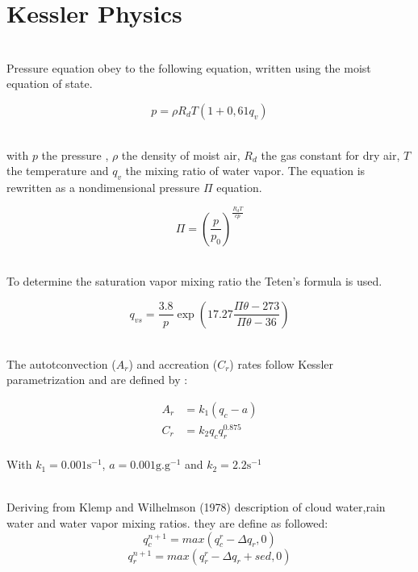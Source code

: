 \documentclass[times,doublespace]{fldauth}
\begin{document}
\clearpage
\section{Kessler Physics}

~\\Pressure equation obey to the following equation, written using the moist equation of state.

\begin{equation}
p=\rho R_dT(1+0,61q_v)
\end{equation}

~\\ with $p$ the pressure , $\rho$ the density of moist air, $R_d$ the gas constant for dry air, $T$ the temperature and $q_v$ the mixing ratio of water vapor. The equation is rewritten as a nondimensional pressure $\Pi$ equation.

\begin{equation}
\Pi=\left(\frac{p}{p_0}\right)^{\frac{R_dT}{cp}}
\end{equation}


~\\To determine the saturation vapor mixing ratio the Teten's formula is used.

\begin{equation}
q_{vs}=\frac{3.8}{p}\exp\left(17.27\frac{\Pi \theta-273}{\Pi \theta-36}\right)
\end {equation}



~\\The autotconvection ($A_r$) and accreation ($C_r$) rates follow Kessler parametrization and are defined by :

\begin{equation}
\begin{split}
A_r&=k_1(q_c-a) \\
C_r&=k_2q_cq_r^{0.875}
\end{split}
\end{equation}
~\\ With $k_1=0.001 \text{s}^{-1}$, $a=0.001 \text{g}.\text{g}^{-1}$ and $k_2=2.2 \text{s}^{-1}$ 

~\\ Deriving from Klemp and Wilhelmson (1978) description of cloud water,rain water and water vapor mixing ratios. they are define as followed:
\begin{equation}
q_c^{n+1}=max(q_c^r-\Delta q_r,0)
\end{equation}
\begin{equation}
q_r^{n+1}=max(q_r^r-\Delta q_r+sed,0)
\end{equation}
\end{document}
